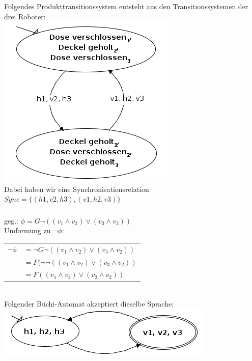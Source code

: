 \documentclass[a4paper,12pt]{scrartcl}
\begin{document}
\subsubsection{}
Folgendes Produkttransitionssystem entsteht aus den Transitionssystemen der drei Roboter:\\
\includegraphics[scale=0.5]{roboter_prod.png}\\
Dabei haben wir eine Synchronisationsrelation $Sync = \{(h1, v2, h3), (v1, h2, v3)\}$
\subsubsection{}
geg.: $\phi = G\lnot((v_1 \land v_2) \lor (v_3 \land v_2))$\\
Umformung zu $\lnot\phi$:\\
\begin{tabular}{ll}
$\lnot\phi$&$=\lnot G\lnot((v_1 \land v_2) \lor (v_3 \land v_2))$\\
&$=F(\lnot\lnot((v_1 \land v_2) \lor (v_3 \land v_2))$\\
&$=F((v_1 \land v_2) \lor (v_3 \land v_2))$
\end{tabular}\\
Folgender Büchi-Automat akzeptiert dieselbe Sprache:\\
\includegraphics[scale=0.5]{roboter_buechi.png}
\subsubsection{}
\end{document}
